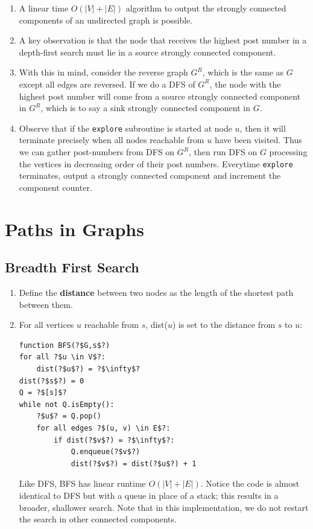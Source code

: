 \documentclass[10pt]{article}
\begin{document}
\begin{multicols}{2}
\begin{addmargin}[0.8em]{0.5em}
\begin{enumerate}[label=(\alph*)]
    \item A linear time $O(|V| + |E|)$ algorithm to output the strongly connected components of an undirected graph is possible.
    \item A key observation is that the node that receives the highest post number in a depth-first search must lie in a source strongly connected component.
    \item With this in mind, consider the reverse graph $G^R$, which is the same as $G$ except all edges are reversed. If we do a DFS of $G^R$, the node with the highest post number will come from a source strongly connected component in $G^R$, which is to say a sink strongly connected component in $G$.
    \item Observe that if the \texttt{explore} subroutine is started at node $u$, then it will terminate precisely when all nodes reachable from $u$ have been visited. Thus we can gather post-numbers from DFS on $G^R$, then run DFS on $G$ processing the vertices in decreasing order of their post numbers. Everytime \texttt{explore} terminates, output a strongly connected component and increment the component counter.
    \end{enumerate}
\end{addmargin}

\section{Paths in Graphs}
\begin{addmargin}[0.8em]{0.5em}
    \subsection{Breadth First Search}
    \begin{enumerate}[label=(\alph*)]
        \item Define the \textbf{distance} between two nodes as the length of the shortest path between them.
        \item For all vertices $u$ reachable from $s$, dist($u$) is set to the distance from $s$ to $u$:        
\begin{verbatim}
function BFS(?$G,s$?)
for all ?$u \in V$?:
    dist(?$u$?) = ?$\infty$?
dist(?$s$?) = 0
Q = ?$[s]$?
while not Q.isEmpty():
    ?$u$? = Q.pop()
    for all edges ?$(u, v) \in E$?:
        if dist(?$v$?) = ?$\infty$?:
            Q.enqueue(?$v$?)
            dist(?$v$?) = dist(?$u$?) + 1
\end{verbatim}
        Like DFS, BFS has linear runtime $O(|V| + |E|)$. Notice the code is almost identical to DFS but with a queue in place of a stack; this results in a broader, shallower search. Note that in this implementation, we do not restart the search in other connected components.


\end{enumerate}
\end{addmargin}
\end{multicols}
\end{document}
